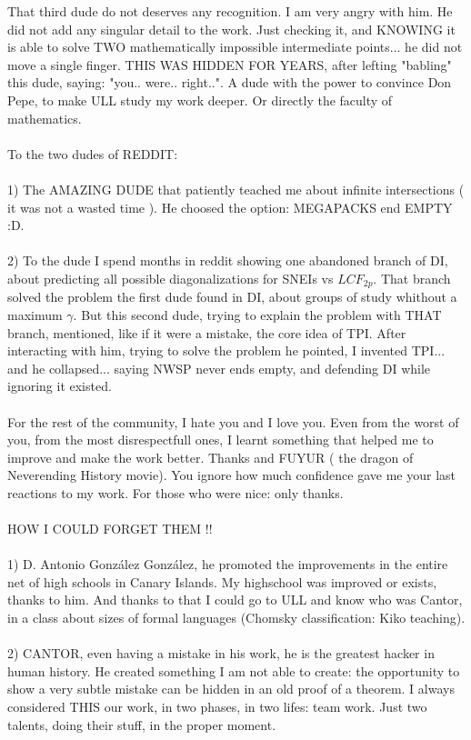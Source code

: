 		\noindent
		That third dude do not deserves any recognition. I am very angry with him. He did not add any singular detail to the work. Just checking it, and KNOWING it is able to solve TWO mathematically impossible intermediate points... he did not move a single finger. THIS WAS HIDDEN FOR YEARS, after lefting "babling" this dude, saying: "you.. were.. right..". A dude with the power to convince Don Pepe, to make ULL study my work deeper. Or directly the faculty of mathematics.
		\\\\
		
		\noindent
		To the two dudes of REDDIT:\\\\
		1) The AMAZING DUDE that patiently teached me about infinite intersections ( it was not a wasted time ). He choosed the option: MEGAPACKS end EMPTY :D.\\\\
		2) To the dude I spend months in reddit showing one abandoned branch of DI, about predicting all possible diagonalizations for SNEIs vs $LCF_{2p}$. That branch solved the problem the first dude found in DI, about groups of study whithout a maximum $\gamma$. But this second dude, trying to explain the problem with THAT branch, mentioned, like if it were a mistake, the core idea of TPI. After interacting with him, trying to solve the problem he pointed, I invented TPI... and he collapsed... saying NWSP never ends empty, and defending DI while ignoring it existed.
		\\\\
		
		\noindent
		For the rest of the community, I hate you and I love you. Even from the worst of you, from the most disrespectfull ones, I learnt something that helped me to improve and make the work better. Thanks and FUYUR ( the dragon of Neverending History movie). You ignore how much confidence gave me your last reactions to my work. For those who were nice: only thanks.
		\\\\
		
		\noindent
		HOW I COULD FORGET THEM !!\\\\
		1) D. Antonio González González, he promoted the improvements in the entire net of high schools in Canary Islands. My highschool was improved or exists, thanks to him. And thanks to that I could go to ULL and know who was Cantor, in a class about sizes of formal languages (Chomsky classification: Kiko teaching).\\\\
		2) CANTOR, even having a mistake in his work, he is the greatest hacker in human history. He created something I am not able to create: the opportunity to show a very subtle mistake can be hidden in an old proof of a theorem. I always considered THIS our work, in two phases, in two lifes: team work. Just two talents, doing their stuff, in the proper moment.
		\\\\
		

